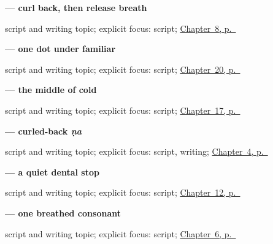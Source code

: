 \noindent\begin{minipage}[t]{\linewidth}
\raggedright
\textbf{ — curl back, then release breath}\par
\footnotesize script and writing topic; explicit focus: script; \hyperref[ch:mw-wellbeing-answer]{Chapter~8, p.~\pageref*{ch:mw-wellbeing-answer}}
\end{minipage}\par\smallskip

\noindent\begin{minipage}[t]{\linewidth}
\raggedright
\textbf{ — one dot under familiar }\par
\footnotesize script and writing topic; explicit focus: script; \hyperref[ch:mw-shopping-seven]{Chapter~20, p.~\pageref*{ch:mw-shopping-seven}}
\end{minipage}\par\smallskip

\noindent\begin{minipage}[t]{\linewidth}
\raggedright
\textbf{ — the middle of cold}\par
\footnotesize script and writing topic; explicit focus: script; \hyperref[ch:mw-weather-six]{Chapter~17, p.~\pageref*{ch:mw-weather-six}}
\end{minipage}\par\smallskip

\noindent\begin{minipage}[t]{\linewidth}
\raggedright
\textbf{ — curled-back \emph{ṇa}}\par
\footnotesize script and writing topic; explicit focus: script, writing; \hyperref[ch:mw-paani]{Chapter~4, p.~\pageref*{ch:mw-paani}}
\end{minipage}\par\smallskip

\noindent\begin{minipage}[t]{\linewidth}
\raggedright
\textbf{ — a quiet dental stop}\par
\footnotesize script and writing topic; explicit focus: script; \hyperref[ch:mw-family-ten]{Chapter~12, p.~\pageref*{ch:mw-family-ten}}
\end{minipage}\par\smallskip

\noindent\begin{minipage}[t]{\linewidth}
\raggedright
\textbf{ — one breathed consonant}\par
\footnotesize script and writing topic; explicit focus: script; \hyperref[ch:mw-name-question]{Chapter~6, p.~\pageref*{ch:mw-name-question}}
\end{minipage}\par\smallskip

